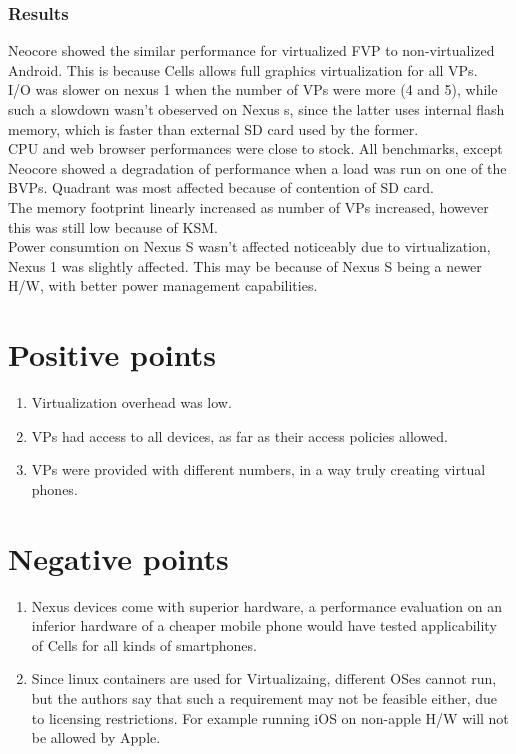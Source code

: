 \documentclass[a4paper,10pt]{article}
\begin{document}
 \subsubsection*{Results}
 Neocore showed the similar performance for virtualized FVP to non-virtualized Android. This is because Cells allows full graphics virtualization for all VPs.
 \\
 I/O was slower on nexus 1 when the number of VPs were more (4 and 5), while such a slowdown wasn't obeserved on Nexus s, since the latter uses internal flash memory, which is
 faster than external SD card used by the former.
 \\CPU and web browser performances were close to stock.
 All benchmarks, except Neocore showed a degradation of performance when a load was run on one of the BVPs. Quadrant was most affected because of contention of SD card.
 \\
 The memory footprint linearly increased as number of VPs increased, however this was still low because of KSM.
 \\
 Power consumtion on Nexus S wasn't affected noticeably due to virtualization, Nexus 1 was slightly affected. This may be because of Nexus S being a newer H/W, with better power management capabilities.
\section*{Positive points}
\begin{enumerate}
 \item Virtualization overhead was low.
 \item VPs had access to all devices, as far as their access policies allowed.
 \item VPs were provided with different numbers, in a way truly creating virtual phones.
 
 
\end{enumerate}
\section*{Negative points}
\begin{enumerate}
 \item Nexus devices come with superior hardware, a performance evaluation on an inferior hardware of a cheaper mobile phone would have tested applicability of Cells for all kinds of smartphones.
\item Since linux containers are used for Virtualizaing, different OSes cannot run, but the authors say that such a requirement may not be feasible either, due to licensing restrictions. For example running iOS on non-apple H/W will not be allowed by Apple.
 \end{enumerate}

 
\end{document}
